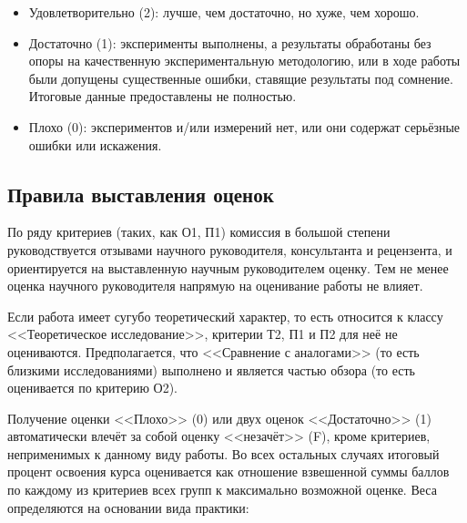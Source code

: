 \documentclass{article}
\begin{document}
\begin{itemize}
\begin{itemize}
        \item Удовлетворительно (2): лучше, чем достаточно, но хуже, чем хорошо.
        \item Достаточно (1): эксперименты выполнены, а результаты обработаны без опоры на качественную экспериментальную методологию, или в ходе работы были допущены существенные ошибки, ставящие результаты под сомнение. Итоговые данные предоставлены не полностью.
        \item Плохо (0): экспериментов и/или измерений нет, или они содержат серьёзные ошибки или искажения.
    \end{itemize}
\end{itemize}

\subsection{Правила выставления оценок}

По ряду критериев (таких, как О1, П1) комиссия в большой степени руководствуется отзывами научного руководителя, консультанта и рецензента, и ориентируется на выставленную научным руководителем оценку. Тем не менее оценка научного руководителя напрямую на оценивание работы не влияет.

Если работа имеет сугубо теоретический характер, то есть относится к классу <<Теоретическое исследование>>, критерии Т2, П1 и П2 для неё не оцениваются. Предполагается, что <<Сравнение с аналогами>> (то есть близкими исследованиями) выполнено и является частью обзора (то есть оценивается по критерию О2).

Получение оценки <<Плохо>> (0) или двух оценок <<Достаточно>> (1) автоматически влечёт за собой оценку <<незачёт>> (F), кроме критериев, неприменимых к данному виду работы. Во всех остальных случаях итоговый процент освоения курса оценивается как отношение взвешенной суммы баллов по каждому из критериев всех групп к максимально возможной оценке. Веса определяются на основании вида практики:
\end{document}
